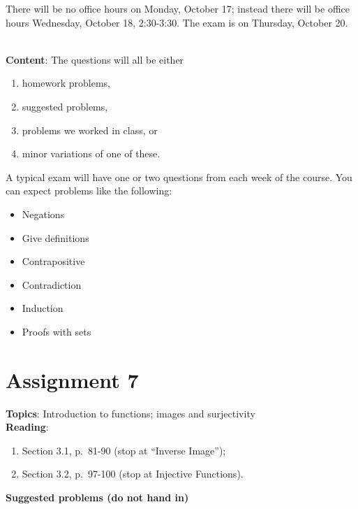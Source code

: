 \documentclass[12pt]{article}
\begin{document}
There will be no office hours on Monday, October 17; instead there will be office hours Wednesday, October 18, 2:30-3:30. The exam is on Thursday, October 20.

\\

\noindent \textbf{Content}: The questions will all be either
\begin{enumerate}
\item homework problems,
\item suggested problems,
\item problems we worked in class, or
\item minor variations of one of these.
\end{enumerate}


A typical exam will have one or two questions from each week of the course. You can expect problems like the following:
\begin{itemize}
\item Negations
\item Give definitions
\item Contrapositive  
\item Contradiction
\item Induction
\item Proofs with sets
\end{itemize}







\newpage
\section[7 (due November 1): Introduction to functions; images and surjectivity.]{Assignment 7}


\textbf{Topics}: Introduction to functions; images and surjectivity
\\

\noindent \textbf{Reading}:
\begin{enumerate}
\item Section 3.1, p.~81-90 (stop at ``Inverse Image'');
\item Section 3.2, p.~97-100 (stop at Injective Functions).
\end{enumerate}




\noindent \textbf{Suggested problems (do not hand in)}
\end{document}
